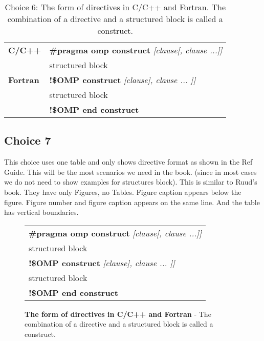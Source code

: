 \begin{table}[h!]
\centering
\label{fig:choice6}
\begin{tabular}{|l|l|} \hline
\textbf{C/C++} & \textbf{\#pragma omp construct} \textit{[clause[, clause ...]]} \\ & \hspace{5mm} structured block \\                 \hline
\textbf{Fortran} & \textbf{!\$OMP construct} \textit{ [clause], clause ... ]]}  \\ & \hspace{5mm} structured block   \\ &   \textbf{!\$OMP end construct} \\     
                   
\hline

\end{tabular}
\caption{Choice 6: The form of directives in C/C++ and Fortran.  The 
combination of a directive and a structured 
block is called a construct.}
\end{table}


\subsection{Choice 7}

This choice uses one table and only shows directive format as shown in the 
Ref Guide. This will be the most scenarios we need in the book. (since in 
most cases we do not need to show examples for structures block).  This is 
similar to Ruud's book. 
They have only Figures, no Tables. Figure caption appears below the figure. 
 Figure number and figure caption appears on the same line. And the table 
 has vertical boundaries.




\begin{figure}[h!]
\centering
\label{fig:choice7}
\begin{tabular}{|l|} \hline
\textbf{\#pragma omp construct} \textit{[clause[, clause ...]]} \\ 
\hspace{5mm} structured block \\                 
\hline
\textbf{!\$OMP construct} \textit{ [clause], clause ... ]]}  \\ 
\hspace{5mm} structured block   \\ 
\textbf{!\$OMP end construct} \\     
                  
\hline

\end{tabular}
\caption{\textbf{The form of directives in C/C++ and Fortran} - The 
combination of a directive and a structured 
block is called a construct.}
\end{figure}
